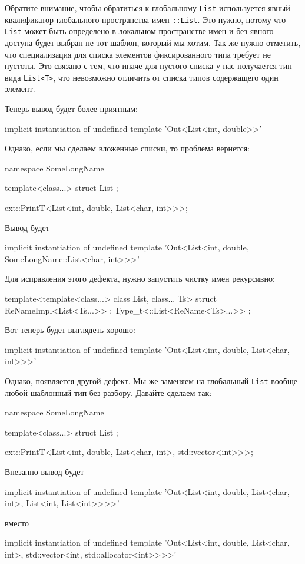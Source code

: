 Обратите внимание, чтобы обратиться к глобальному \verb"List" используется явный квалификатор глобального пространства имен \verb"::List".
Это нужно, потому что \verb"List" может быть определено в локальном пространстве имен и без явного доступа будет выбран не тот шаблон, который мы хотим.
Так же нужно отметить, что специализация для списка элементов фиксированного типа требует не пустоты.
Это связано с тем, что иначе для пустого списка у нас получается тип вида \verb"List<T>", что невозможно отличить от списка типов содержащего один элемент.

Теперь вывод будет более приятным:
\begin{cppcode}
implicit instantiation of undefined template 'Out<List<int, double>>'
\end{cppcode}
Однако, если мы сделаем вложенные списки, то проблема вернется:
\begin{cppcode}
namespace SomeLongName {
  template<class...>
  struct List {};
  
  ext::PrintT<List<int, double, List<char, int>>>;
}
\end{cppcode}
Вывод будет
\begin{cppcode}
implicit instantiation of undefined template
'Out<List<int, double, SomeLongName::List<char, int>>>'
\end{cppcode}
Для исправления этого дефекта, нужно запустить чистку имен рекурсивно:
\begin{cppcode}
template<template<class...> class List, class... Ts>
struct ReNameImpl<List<Ts...>> : Type_t<::List<ReName<Ts>...>> {};
\end{cppcode}
Вот теперь будет выглядеть хорошо:
\begin{cppcode}
implicit instantiation of undefined template 'Out<List<int, double, List<char, int>>>'
\end{cppcode}
Однако, появляется другой дефект.
Мы же заменяем на глобальный \verb"List" вообще любой шаблонный тип без разбору.
Давайте сделаем так:
\begin{cppcode}
namespace SomeLongName {
  template<class...>
  struct List {};
  
  ext::PrintT<List<int, double, List<char, int>, std::vector<int>>>;
}
\end{cppcode}
Внезапно вывод будет
\begin{cppcode}
implicit instantiation of undefined template
'Out<List<int, double, List<char, int>, List<int, List<int>>>>'
\end{cppcode}
вместо
\begin{cppcode}
implicit instantiation of undefined template
'Out<List<int, double, List<char, int>, std::vector<int, std::allocator<int>>>>'
\end{cppcode}
